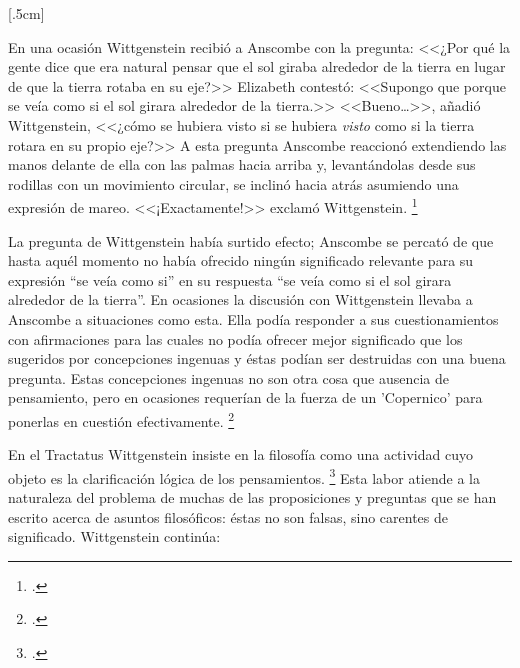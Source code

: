 \documentclass[../main.tex]{subfiles}
\begin{document}



[.5cm]


En una ocasión Wittgenstein recibió a Anscombe con la pregunta: <<¿Por qué la gente dice que era natural pensar que el sol giraba alrededor de la tierra en lugar de que la tierra rotaba en su eje?>> Elizabeth contestó: <<Supongo que porque se veía como si el sol girara alrededor de la tierra.>> <<Bueno\ldots>>, añadió Wittgenstein, <<¿cómo se hubiera visto si se hubiera \emph{visto} como si la tierra rotara en su propio eje?>> A esta pregunta Anscombe reaccionó extendiendo las manos delante de ella con las palmas hacia arriba y, levantándolas desde sus rodillas con un movimiento circular, se inclinó hacia atrás asumiendo una expresión de mareo. <<¡Exactamente!>> exclamó Wittgenstein. \footcite[151]{IWT}


La pregunta de Wittgenstein había surtido efecto; Anscombe se percató de que hasta aquél momento no había ofrecido ningún significado relevante para su expresión ``se veía como si'' en su respuesta ``se veía como si el sol girara alrededor de la tierra''. En ocasiones la discusión con Wittgenstein llevaba a Anscombe a situaciones como esta. Ella podía responder a sus cuestionamientos con afirmaciones para las cuales no podía ofrecer mejor significado que los sugeridos por concepciones ingenuas y éstas podían ser destruidas con una buena pregunta. Estas concepciones ingenuas no son otra cosa que ausencia de pensamiento, pero en ocasiones requerían de la fuerza de un 'Copernico' para ponerlas en cuestión efectivamente.  \footcite[cf. 151]{IWT}



En el Tractatus Wittgenstein insiste en la filosofía como una actividad cuyo objeto es la clarificación lógica de los pensamientos. \footcite[4.112 p. 52]{tractatus} Esta labor atiende a la naturaleza del problema de muchas de las proposiciones y preguntas que se han escrito acerca de asuntos filosóficos: éstas no son falsas, sino carentes de significado. Wittgenstein continúa:
\end{document}
